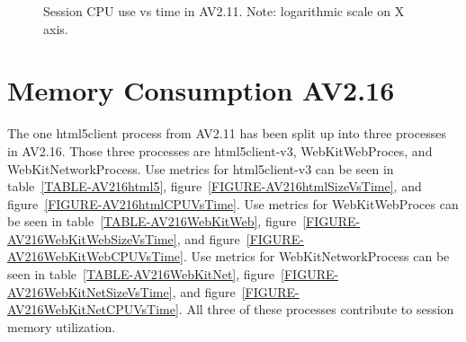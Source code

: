 \documentclass{article}
\begin{document}
\begin{figure}[H]
        \caption{\label{FIGURE-AV211CPUVsTime} Session CPU use vs time in AV2.11. Note: logarithmic scale on X axis.}
\end{figure}



\newpage

\section{Memory Consumption AV2.16}
\label{SECTION-216Memory}

The one html5client process from AV2.11 has been split up into three processes in AV2.16. Those three processes are html5client-v3, WebKitWebProces, and WebKitNetworkProcess. Use metrics for html5client-v3 can be seen in table~\ref{TABLE-AV216html5}, figure~\ref{FIGURE-AV216htmlSizeVsTime}, and figure~\ref{FIGURE-AV216htmlCPUVsTime}. Use metrics for WebKitWebProces can be seen in table~\ref{TABLE-AV216WebKitWeb}, figure~\ref{FIGURE-AV216WebKitWebSizeVsTime}, and figure~\ref{FIGURE-AV216WebKitWebCPUVsTime}. Use metrics for WebKitNetworkProcess can be seen in table~\ref{TABLE-AV216WebKitNet}, figure~\ref{FIGURE-AV216WebKitNetSizeVsTime}, and figure~\ref{FIGURE-AV216WebKitNetCPUVsTime}. All three of these processes contribute to session memory utilization. 
\end{document}
